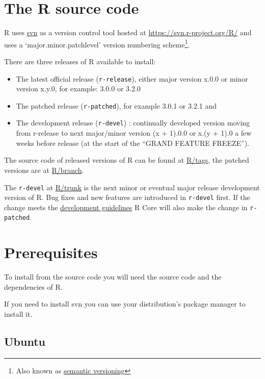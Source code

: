 \documentclass[
]{book}
\begin{document}
\section{The R source code}\label{the-r-source-code}

R uses \href{https://subversion.apache.org/}{svn} as a version control tool hosted at \url{https://svn.r-project.org/R/} and uses a `major.minor.patchlevel' version numbering scheme\footnote{Also known as \href{https://en.wikipedia.org/wiki/Software_versioning\#Semantic_versioning}{semantic versioning}}.

There are three releases of R available to install:

\begin{itemize}
\item
  The latest official release (\texttt{r-release}), either major version x.0.0 or minor version x.y.0, for example: 3.0.0 or 3.2.0
\item
  The patched release (\texttt{r-patched}), for example 3.0.1 or 3.2.1 and
\item
  The development release (\texttt{r-devel}) : continually developed version moving from r-release to next major/minor version (x + 1).0.0 or x.(y + 1).0 a few weeks before release (at the start of the ``GRAND FEATURE FREEZE'').
\end{itemize}

The source code of released versions of R can be found at \href{https://svn.r-project.org/R/tags/}{R/tags}, the patched versions are at \href{https://svn.r-project.org/R/branches/}{R/branch}.

The \texttt{r-devel} at \href{https://svn.r-project.org/R/trunk}{R/trunk} is the next minor or eventual major release development version of R.
Bug fixes and new features are introduced in \texttt{r-devel} first.
If the change meets the \href{https://developer.r-project.org/devel-guidelines.txt}{development guidelines} R Core will also make the change in \texttt{r-patched}.

\section{Prerequisites}\label{prerequisites}

To install from the source code you will need the source code and the dependencies of R.

If you need to install svn you can use your distribution's package manager to install it.

\subsection{Ubuntu}\label{ubuntu}
\end{document}
